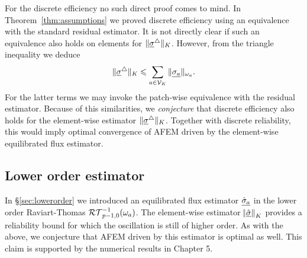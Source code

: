 \documentclass[thesis.tex]{subfiles}
\begin{document}
  For the discrete efficiency no such direct proof comes to mind. In Theorem~\ref{thm:assumptions} we proved discrete efficiency
  using an equivalence with the standard residual estimator. It is not directly clear if such an equivalence also holds on elements
  for $\| \underline{\sigma}^\triangle \|_K$. However, from the triangle inequality we deduce
  \[
    \| \underline{\sigma}^\triangle \|_K \leqslant \sum_{a \in \mathcal{V}_K} \| \underline{\sigma_a} \|_{\omega_a}.
  \]
  For the latter terms we may invoke the patch-wise equivalence with the residual estimator. 
  Because of this similarities, we \emph{conjecture} that discrete efficiency also holds
  for the element-wise estimator $\| \underline{\sigma}^\triangle \|_K$.
 Together with discrete reliability, this would imply optimal convergence of AFEM driven by the element-wise equilibrated flux estimator.

  \subsection{Lower order estimator}
  In \S\ref{sec:lowerorder} we introduced an equilibrated flux estimator $\underline{\hat \sigma_a}$ in the lower order Raviart-Thomas $\mathcal{RT}_{p-1,0}^{-1}(\omega_a)$. 
  The element-wise estimator $\norm{\underline{\hat \sigma}}_K$ provides a reliability bound for which the oscillation is still of higher order. 
  As with the above, we conjecture that AFEM driven
  by this estimator is optimal as well. This claim is supported by the numerical results in Chapter 5.
\end{document}
